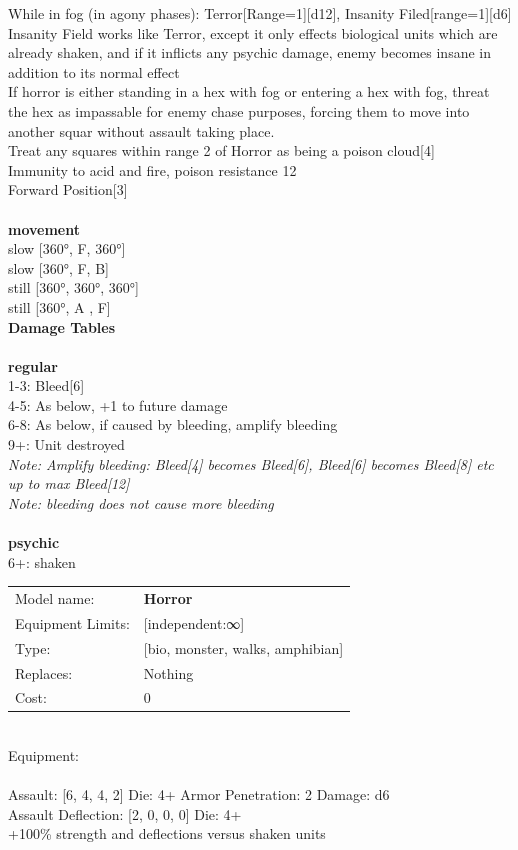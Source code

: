 \noindent While in fog (in agony phases): Terror[Range=1][d12], Insanity Filed[range=1][d6]\\ 
Insanity Field works like Terror, except it only effects biological units which are already shaken, and if it inflicts any psychic damage, enemy becomes insane in addition to its normal effect\\ 
If horror is either standing in a hex with fog or entering a hex with fog, threat the hex as impassable for enemy chase purposes, forcing them to move into another squar without assault taking place.\\ 
Treat any squares within range 2 of Horror as being a poison cloud[4]\\ 
Immunity to acid and fire, poison resistance 12\\ 
Forward Position[3]\\ 


\ \\ {\bf movement } \\
slow [360°, F, 360°] \\
slow [360°, F, B] \\
still [360°, 360°, 360°] \\
still [360°, A , F] \\


{\bf Damage Tables} \\
\ \\ {\bf regular } \\
1-3: Bleed[6] \\
4-5: As below, +1 to future damage \\
6-8: As below, if caused by bleeding, amplify bleeding \\
9+: Unit destroyed \\
{{\it Note:  Amplify bleeding: Bleed[4] becomes Bleed[6], Bleed[6] becomes Bleed[8] etc up to max Bleed[12]}} \\
{{\it Note: bleeding does not cause more bleeding}} \\
\ \\ {\bf psychic } \\
6+: shaken \\


\noindent
\begin{tabular}{ll}
Model name: &{\bf Horror } \\
Equipment Limits: &[independent:∞] \\
Type: &[bio, monster, walks, amphibian] \\
Replaces: &Nothing \\
Cost: & 0\\
\end{tabular}
\ \\
Equipment:  \\
\ \\
Assault: [6, 4, 4, 2] Die: 4+ Armor Penetration: 2 Damage: d6 \\
Assault Deflection: [2, 0, 0, 0] Die: 4+\\
\indent +100\% strength and deflections versus shaken units\\ 
 
